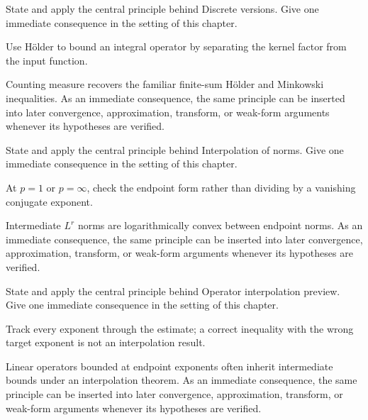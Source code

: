 \begin{exercise}\label{exr:iii07-06}
State and apply the central principle behind Discrete versions. Give one immediate consequence in the setting of this chapter.
\end{exercise}
\begin{hint}
Use Hölder to bound an integral operator by separating the kernel factor from the input function.
\end{hint}
\begin{solution}
Counting measure recovers the familiar finite-sum Hölder and Minkowski inequalities. As an immediate consequence, the same principle can be inserted into later convergence, approximation, transform, or weak-form arguments whenever its hypotheses are verified.
\end{solution}

\begin{exercise}\label{exr:iii07-07}
State and apply the central principle behind Interpolation of norms. Give one immediate consequence in the setting of this chapter.
\end{exercise}
\begin{hint}
At \(p=1\) or \(p=\infty\), check the endpoint form rather than dividing by a vanishing conjugate exponent.
\end{hint}
\begin{solution}
Intermediate $L^r$ norms are logarithmically convex between endpoint norms. As an immediate consequence, the same principle can be inserted into later convergence, approximation, transform, or weak-form arguments whenever its hypotheses are verified.
\end{solution}

\begin{exercise}\label{exr:iii07-08}
State and apply the central principle behind Operator interpolation preview. Give one immediate consequence in the setting of this chapter.
\end{exercise}
\begin{hint}
Track every exponent through the estimate; a correct inequality with the wrong target exponent is not an interpolation result.
\end{hint}
\begin{solution}
Linear operators bounded at endpoint exponents often inherit intermediate bounds under an interpolation theorem. As an immediate consequence, the same principle can be inserted into later convergence, approximation, transform, or weak-form arguments whenever its hypotheses are verified.
\end{solution}


